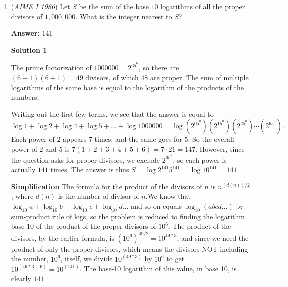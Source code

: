 \begin{enumerate}
 {$3^0, ..., 3^5, 729, 729 + 1, .... 729 + (1 + 3^1 + . . . +3^4)$}

 Our sequence now has $63 + 1 + 31 = 95$ terms. The remaining $5$ would just be the smallest sums starting with $729 + 243$ or $972$:

 [$972$, $972 + 1$, $972 + 3$, $972+1+3$, $972 + 9$]

 Hence the 100th term would be $972 + 9 = \boxed{981}$. ~SoilMilk

 ${}^{*}$Note that there isn't a ${n+1\choose 0}$ as choosing 0 numbers will not give you a term.

 


 


	\item (\textit{AIME I 1986}) Let $S$ be the sum of the base $10$ logarithms of all the proper divisors of $1{,}000{,}000$. What is the integer nearest to $S$?


 
 \textbf{Answer: }141



\textbf{Solution 1}

The \href{https://artofproblemsolving.com/wiki/index.php?title=Prime\_factorization}{prime factorization} of $1000000 = 2^65^6$, so there are $(6 + 1)(6 + 1) = 49$ divisors, of which $48$ are proper. The sum of multiple logarithms of the same base is equal to the logarithm of the products of the numbers. 

 Writing out the first few terms, we see that the answer is equal to 
 \[\log 1 + \log 2 + \log 4 + \log 5 +\ldots + \log 1000000 = \log (2^05^0)(2^15^0)(2^25^0)\cdots (2^65^6).\] Each power of $2$ appears $7$ times; and the same goes for $5$. So the overall power of $2$ and $5$ is $7(1+2+3+4+5+6) = 7 \cdot 21 = 147$. However, since the question asks for proper divisors, we exclude $2^65^6$, so each power is actually $141$ times. The answer is thus $S = \log 2^{141}5^{141} = \log 10^{141} = \boxed{141}$.

 \textbf{Simplification} The formula for the product of the divisors of $n$ is $n^{(d(n))/2}$, where $d(n)$ is the number of divisor of $n$.We know that $\log_{10} a + \log_{10} b + \log_{10} c + \log_{10} d...$ and so on equals $\log_{10} (abcd...)$ by sum-product rule of logs, so the problem is reduced to finding the logarithm base 10 of the product of the proper divisors of $10^6$. The product of the divisors, by the earlier formula, is ${(10^6)}^{49/2} = 10^{49*3}$, and since we need the product of only the proper divisors, which means the divisors NOT including the number, $10^6$, itself, we divide $10^{(49*3)}$ by $10^6$ to get $10^{(49*3-6)} = 10^{(141)}$. The base-10 logarithm of this value, in base 10, is clearly $\boxed{141}$





\end{enumerate}
